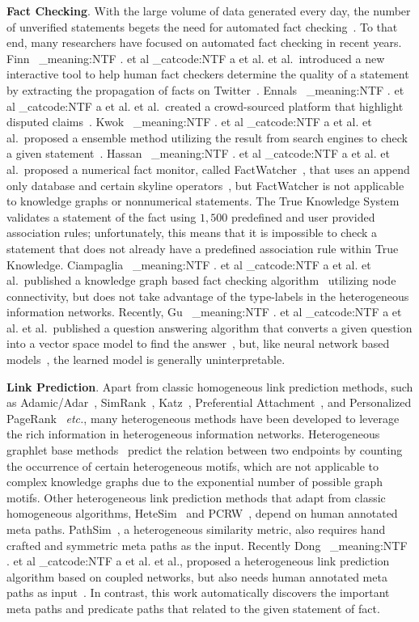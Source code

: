 \documentclass[reprint,twocolumn,showpacs,preprintnumbers,amsmath, aps,pre,amssymb]{revtex4-1}
\makeatletter
\newcommand\latinabbrev[1]{
  \peek_meaning:NTF . {%
    #1\@}%
  { \peek_catcode:NTF a {%
      #1.\@ }%
    {#1.\@}}}
\newcommand\etal{\latinabbrev{et al}}
\makeatother
\begin{document}
\vspace{5pt}\noindent\textbf{Fact Checking}. With the large volume of data generated every day, the number of unverified statements begets the need for automated fact checking~\cite{Graves2012,Cohen2011}. To that end, many researchers have focused on automated fact checking in recent years. Finn~\etal~introduced a new interactive tool to help human fact checkers determine the quality of a statement by extracting the propagation of facts on Twitter~\cite{Finn2014}. Ennals~\etal~created a crowd-sourced platform that highlight disputed claims~\cite{Ennals2010}. Kwok~\etal~proposed a ensemble method utilizing the result from search engines to check a given statement~\cite{Kwok2001}. Hassan~\etal~proposed a numerical fact monitor, called FactWatcher~\cite{Hassan2014}, that uses an append only database and certain skyline operators~\cite{Wu2012,Jiang2011}, but FactWatcher is not applicable to knowledge graphs or nonnumerical statements. The True Knowledge System~\cite{TunstallPedoe2010} validates a statement of the fact using $1,500$ predefined and user provided association rules; unfortunately, this means that it is impossible to check a statement that does not already have a predefined association rule within True Knowledge. Ciampaglia~\etal~published a knowledge graph based fact checking algorithm~\cite{Ciampaglia2015} utilizing node connectivity, but does not take advantage of the type-labels in the heterogeneous information networks. Recently, Gu~\etal~published a question answering algorithm that converts a given question into a vector space model to find the answer~\cite{Gu2015}, but, like neural network based models~\cite{Mikolov2013}, the learned model is generally uninterpretable.


\vspace{5pt}\noindent\textbf{Link Prediction}. Apart from classic homogeneous link prediction methods, such as Adamic/Adar~\cite{Adamic2003}, SimRank~\cite{Jeh2002}, Katz~\cite{Katz1953}, Preferential Attachment~\cite{Barabasi1999}, and Personalized PageRank~\cite{Haveliwala2002} {\em etc.}, many heterogeneous methods have been developed to leverage the rich information in heterogeneous information networks. Heterogeneous graphlet base methods~\cite{Lichtenwalter2012} predict the relation between two endpoints by counting the occurrence of certain heterogeneous motifs, which are not applicable to complex knowledge graphs due to the exponential number of possible graph motifs. Other heterogeneous link prediction methods that adapt from classic homogeneous algorithms, HeteSim~\cite{Shi2014} and PCRW~\cite{Lao2010}, depend on human annotated meta paths. PathSim~\cite{Sun2011}, a heterogeneous similarity metric, also requires hand crafted and symmetric meta paths as the input. Recently Dong~\etal, proposed a heterogeneous link prediction algorithm based on coupled networks, but also needs human annotated meta paths as input~\cite{Dong2015}. In contrast, this work automatically discovers the important meta paths and predicate paths that related to the given statement of fact.
\end{document}
